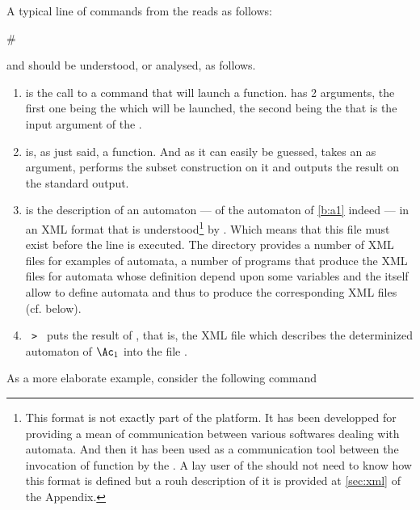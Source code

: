 A typical line of commands from the \tafkit reads as follows:
\begin{shell}
# 
\end{shell}
and should be understood, or analysed, as follows.
\begin{enumerate}
\item {} is the call to a  command
  that will launch a \Vauc function.   has 2
  arguments, the first one being the  which will be
  launched, the second being the  that is the input
  argument of the .

\item {} is, as just said, a \Vauc function.  And as
  it can easily be guessed,  takes an
   as argument, performs the subset construction on it
  and outputs the result on the standard output.

\item {} is the description of an automaton --- of the
  automaton of \autoref{b:a1} indeed --- in an XML format that is
  understood\footnote{%
    This format is not exactly part of the \Vauc platform.  It has
    been developped for providing a mean of communication between
    various softwares dealing with automata.  And then it has been
    used as a communication tool between the invocation of \Vauc
    function by the \tafkit.  A lay user of the \tafkit should not
    need to know how this format is defined but a rouh description of
    it is provided at \autoref{sec:xml} of the Appendix.}  by \Vauc.
  Which means that this file must exist before the line is executed.
  The  directory provides a number of XML files
  for examples of automata, a number of programs that produce the XML
  files for automata whose definition depend upon some variables and
  the \tafkit itself allow to define automata and thus to produce the
  corresponding XML files (cf. below).

\item \verb+ > +  puts the result of
   , that is, the XML file which
  describes the determinized automaton of $\Ac_{1}$ into the file
  .
\end{enumerate}

\bigskip

As a more elaborate example, consider the following command

